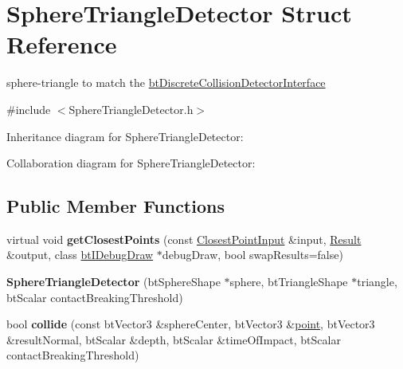 \hypertarget{struct_sphere_triangle_detector}{\section{Sphere\+Triangle\+Detector Struct Reference}
\label{struct_sphere_triangle_detector}
}


sphere-\/triangle to match the \hyperlink{structbt_discrete_collision_detector_interface}{bt\+Discrete\+Collision\+Detector\+Interface}  




{\ttfamily \#include $<$Sphere\+Triangle\+Detector.\+h$>$}



Inheritance diagram for Sphere\+Triangle\+Detector\+:


Collaboration diagram for Sphere\+Triangle\+Detector\+:
\subsection*{Public Member Functions}
\begin{DoxyCompactItemize}
\item 
\hypertarget{struct_sphere_triangle_detector_adb974f84a9f7359d89a8a88af08de74f}{virtual void {\bfseries get\+Closest\+Points} (const \hyperlink{structbt_discrete_collision_detector_interface_1_1_closest_point_input}{Closest\+Point\+Input} \&input, \hyperlink{structbt_discrete_collision_detector_interface_1_1_result}{Result} \&output, class \hyperlink{classbt_i_debug_draw}{bt\+I\+Debug\+Draw} $\ast$debug\+Draw, bool swap\+Results=false)}\label{struct_sphere_triangle_detector_adb974f84a9f7359d89a8a88af08de74f}

\item 
\hypertarget{struct_sphere_triangle_detector_a747f233ff1baeb269d4ecd7d42c49870}{{\bfseries Sphere\+Triangle\+Detector} (bt\+Sphere\+Shape $\ast$sphere, bt\+Triangle\+Shape $\ast$triangle, bt\+Scalar contact\+Breaking\+Threshold)}\label{struct_sphere_triangle_detector_a747f233ff1baeb269d4ecd7d42c49870}

\item 
\hypertarget{struct_sphere_triangle_detector_a21942d541c626d8958d28abc1d2ca5aa}{bool {\bfseries collide} (const bt\+Vector3 \&sphere\+Center, bt\+Vector3 \&\hyperlink{structpoint}{point}, bt\+Vector3 \&result\+Normal, bt\+Scalar \&depth, bt\+Scalar \&time\+Of\+Impact, bt\+Scalar contact\+Breaking\+Threshold)}\label{struct_sphere_triangle_detector_a21942d541c626d8958d28abc1d2ca5aa}

\end{DoxyCompactItemize}


